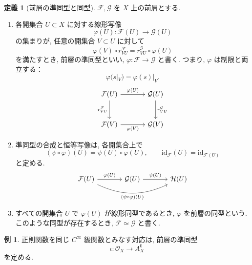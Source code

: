 \documentclass[dvipdfmx,a4paper,11pt]{article} %
\theoremstyle{definition}
\numberwithin{equation}{section}
\newtheorem{dfn}[thm]{定義}
\newtheorem{exa}[thm]{例}
\begin{document}
\begin{dfn}[前層の準同型と同型]\label{O-M181}\label{O-M183}
$\mathcal F,\mathcal G$ を $X$ 上の前層とする.
\begin{enumerate}
\item
各開集合 $U\subset X$ に対する線形写像
\[
\varphi(U):\mathcal F(U)\longrightarrow\mathcal G(U)
\]
の集まりが, 任意の開集合 $V\subset U$ に対して
\[
\varphi(V)\circ r^{\mathcal F}_{VU}
=r^{\mathcal G}_{VU}\circ\varphi(U)
\]
を満たすとき, 前層の準同型といい, 
$\varphi:\mathcal F\to\mathcal G$ と書く.
つまり, $\varphi$ は制限と両立する：
\[
\varphi(s|_V)=\varphi(s)|_V.
\]
\[
\begin{tikzcd}[column sep=large,row sep=large]
\mathcal F(U)\arrow[r,"\varphi(U)"]\arrow[d,"r^{\mathcal F}_{VU}"']
&\mathcal G(U)\arrow[d,"r^{\mathcal G}_{VU}"]\\
\mathcal F(V)\arrow[r,"\varphi(V)"']&\mathcal G(V)
\end{tikzcd}
\]


\item
準同型の合成と恒等写像は, 各開集合上で
\[
(\psi\circ\varphi)(U)=\psi(U)\circ\varphi(U),\qquad
\mathrm{id}_{\mathcal F}(U)=\mathrm{id}_{\mathcal F(U)}
\]
と定める.
\[
\begin{tikzcd}[column sep=large]
\mathcal F(U)\arrow[r,"\varphi(U)"]\arrow[rr,bend right=25,"(\psi\circ\varphi)(U)"']
&\mathcal G(U)\arrow[r,"\psi(U)"]&\mathcal H(U)
\end{tikzcd}
\]



\item
すべての開集合 $U$ で $\varphi(U)$ が線形同型であるとき, 
$\varphi$ を前層の同型という.
このような同型が存在するとき, 
$\mathcal F\simeq\mathcal G$ と書く.

\end{enumerate}
\end{dfn}

\begin{exa}
正則関数を同じ $C^\infty$ 級関数とみなす対応は, 
前層の準同型
\[
\iota:\mathcal O_X\longrightarrow A_X^0
\]
を定める.
\end{exa}
\end{document}
